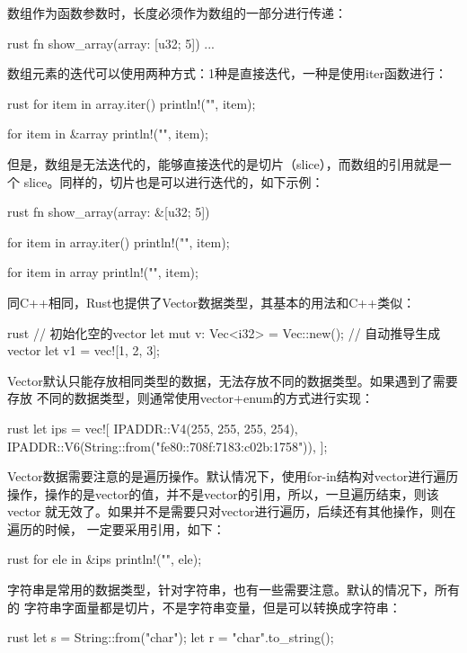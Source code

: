 数组作为函数参数时，长度必须作为数组的一部分进行传递：
\begin{code-block}{rust}
fn show_array(array: [u32; 5]) {
    ...
}
\end{code-block}

数组元素的迭代可以使用两种方式：1种是直接迭代，一种是使用iter函数进行：
\begin{code-block}{rust}
for item in array.iter() {
    println!("{}", item);
}

for item in &array {
    println!("{}", item);
}
\end{code-block}
但是，数组是无法迭代的，能够直接迭代的是切片（slice），而数组的引用就是一个
slice。同样的，切片也是可以进行迭代的，如下示例：
\begin{code-block}{rust}
fn show_array(array: &[u32; 5]) {
    for item in array.iter() {
        println!("{}", item);
    }

    for item in array {
        println!("{}", item);
    }
}
\end{code-block}

同C++相同，Rust也提供了Vector数据类型，其基本的用法和C++类似：
\begin{code-block}{rust}
// 初始化空的vector
let mut v: Vec<i32> = Vec::new();
// 自动推导生成vector
let v1 = vec![1, 2, 3];
\end{code-block}

Vector默认只能存放相同类型的数据，无法存放不同的数据类型。如果遇到了需要存放
不同的数据类型，则通常使用vector+enum的方式进行实现：
\begin{code-block}{rust}
let ips = vec![
    IPADDR::V4(255, 255, 255, 254),
    IPADDR::V6(String::from("fe80::708f:7183:c02b:1758")),
];
\end{code-block}

Vector数据需要注意的是遍历操作。默认情况下，使用for-in结构对vector进行遍历
操作，操作的是vector的值，并不是vector的引用，所以，一旦遍历结束，则该vector
就无效了。如果并不是需要只对vector进行遍历，后续还有其他操作，则在遍历的时候，
一定要采用引用，如下：
\begin{code-block}{rust}
for ele in &ips {
    println!("{}", ele);
}
\end{code-block}

字符串是常用的数据类型，针对字符串，也有一些需要注意。默认的情况下，所有的
字符串字面量都是切片，不是字符串变量，但是可以转换成字符串：
\begin{code-block}{rust}
let s = String::from("char");
let r = "char".to_string();
\end{code-block}

